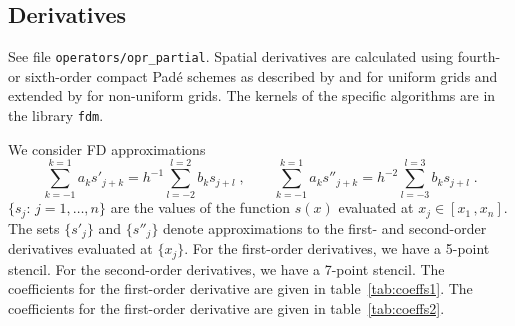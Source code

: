 \subsection{Derivatives}\label{sec:fdm}

See file {\tt operators/opr\_partial}. Spatial derivatives are calculated using fourth- or sixth-order compact Pad\'{e} schemes as described by \cite{Lele:1992} and \cite{Lamballais:2011} for uniform grids and extended by \cite{Shukla:2005} for non-uniform grids. The kernels of the specific algorithms are in the library {\tt fdm}.

We consider FD approximations
\begin{equation}
  \sum_{k=-1}^{k=1}a_ks'_{j+k}=h^{-1}\sum_{l=-2}^{l=2}b_ks_{j+l} \;,\qquad
  \sum_{k=-1}^{k=1}a_ks''_{j+k}=h^{-2}\sum_{l=-3}^{l=3}b_ks_{j+l} \;.
  \label{equ:coefs}
\end{equation}
$\{s_j:\, j=1,\ldots,n\}$ are the values of the function $s(x)$ evaluated at $x_j\in[x_1\,,x_n]$. The sets $\{s'_j\}$ and $\{s''_j\}$ denote approximations to the first- and second-order derivatives evaluated at $\{x_j\}$. For the first-order derivatives, we have a 5-point stencil. For the second-order derivatives, we have a 7-point stencil. The coefficients for the first-order derivative are given in table~\ref{tab:coeffs1}. The coefficients for the first-order derivative are given in table~\ref{tab:coeffs2}.

